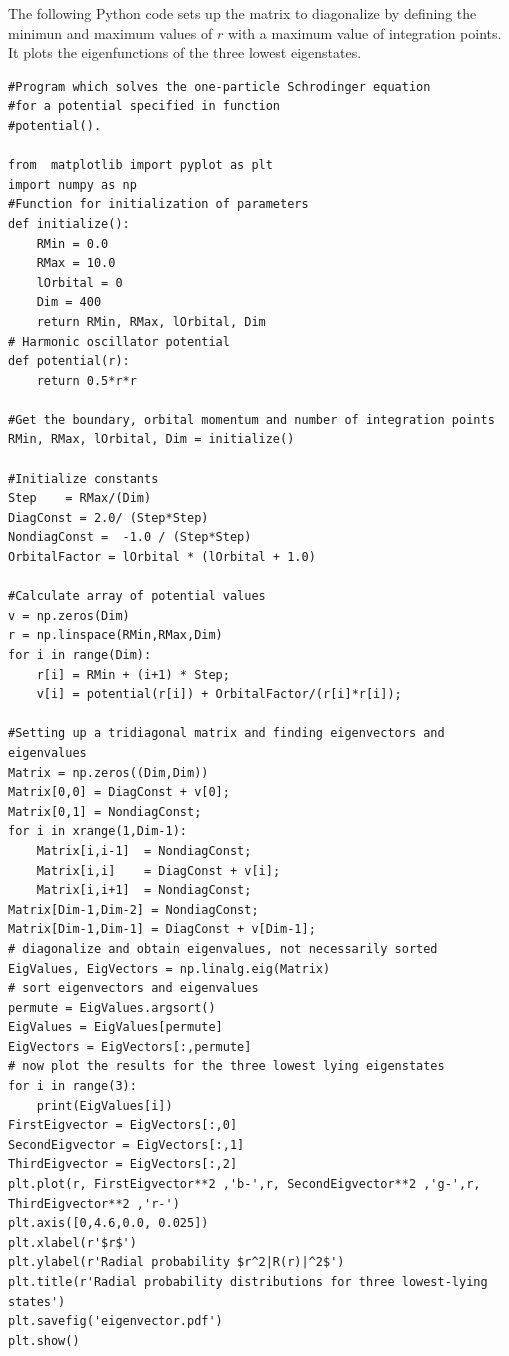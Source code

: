 \documentclass[graybox,envcountchap,sectrefs]{svmult}
\begin{document}
The following Python code sets up the matrix to diagonalize by defining
the minimun and maximum values of $r$ with a maximum value of
integration points. It plots the eigenfunctions of the three lowest
eigenstates.
\begin{lstlisting}
#Program which solves the one-particle Schrodinger equation
#for a potential specified in function
#potential().

from  matplotlib import pyplot as plt
import numpy as np
#Function for initialization of parameters
def initialize():
    RMin = 0.0
    RMax = 10.0
    lOrbital = 0
    Dim = 400
    return RMin, RMax, lOrbital, Dim
# Harmonic oscillator potential
def potential(r):
    return 0.5*r*r

#Get the boundary, orbital momentum and number of integration points
RMin, RMax, lOrbital, Dim = initialize()

#Initialize constants
Step    = RMax/(Dim)
DiagConst = 2.0/ (Step*Step)
NondiagConst =  -1.0 / (Step*Step)
OrbitalFactor = lOrbital * (lOrbital + 1.0)

#Calculate array of potential values
v = np.zeros(Dim)
r = np.linspace(RMin,RMax,Dim)
for i in range(Dim):
    r[i] = RMin + (i+1) * Step;
    v[i] = potential(r[i]) + OrbitalFactor/(r[i]*r[i]);

#Setting up a tridiagonal matrix and finding eigenvectors and eigenvalues
Matrix = np.zeros((Dim,Dim))
Matrix[0,0] = DiagConst + v[0];
Matrix[0,1] = NondiagConst;
for i in xrange(1,Dim-1):
    Matrix[i,i-1]  = NondiagConst;
    Matrix[i,i]    = DiagConst + v[i];
    Matrix[i,i+1]  = NondiagConst;
Matrix[Dim-1,Dim-2] = NondiagConst;
Matrix[Dim-1,Dim-1] = DiagConst + v[Dim-1];
# diagonalize and obtain eigenvalues, not necessarily sorted
EigValues, EigVectors = np.linalg.eig(Matrix)
# sort eigenvectors and eigenvalues
permute = EigValues.argsort()
EigValues = EigValues[permute]
EigVectors = EigVectors[:,permute]
# now plot the results for the three lowest lying eigenstates
for i in range(3):
    print(EigValues[i])
FirstEigvector = EigVectors[:,0]
SecondEigvector = EigVectors[:,1]
ThirdEigvector = EigVectors[:,2]
plt.plot(r, FirstEigvector**2 ,'b-',r, SecondEigvector**2 ,'g-',r, ThirdEigvector**2 ,'r-')
plt.axis([0,4.6,0.0, 0.025])
plt.xlabel(r'$r$')
plt.ylabel(r'Radial probability $r^2|R(r)|^2$')
plt.title(r'Radial probability distributions for three lowest-lying states')
plt.savefig('eigenvector.pdf')
plt.show()
\end{lstlisting}
\end{document}
